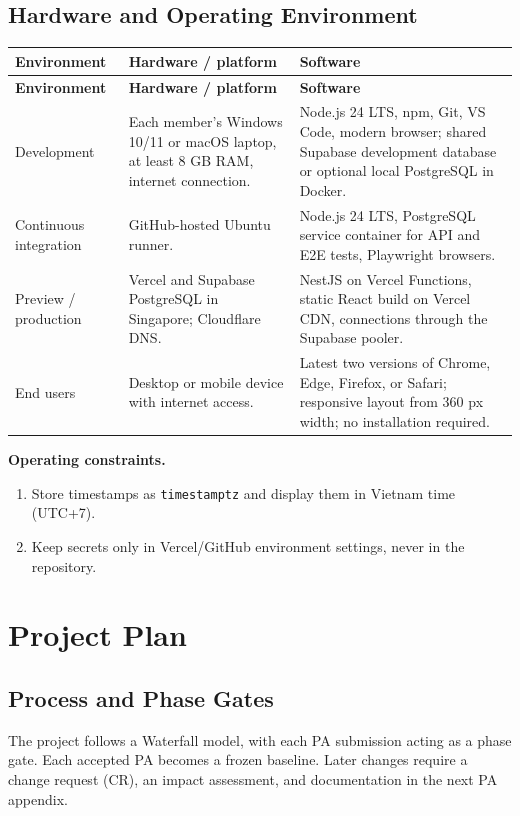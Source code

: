 \documentclass[11pt]{article}
\begin{document}
\subsection{Hardware and Operating Environment}
\begin{longtable}{@{}L{2.5cm}L{5.5cm}L{7.2cm}@{}}
\toprule
\textbf{Environment} & \textbf{Hardware / platform} & \textbf{Software} \\
\midrule
\endfirsthead
\toprule
\textbf{Environment} & \textbf{Hardware / platform} & \textbf{Software} \\
\midrule
\endhead
Development & Each member's Windows 10/11 or macOS laptop, at least 8 GB RAM, internet connection. & Node.js 24 LTS, npm, Git, VS Code, modern browser; shared Supabase development database or optional local PostgreSQL in Docker. \\
Continuous integration & GitHub-hosted Ubuntu runner. & Node.js 24 LTS, PostgreSQL service container for API and E2E tests, Playwright browsers. \\
Preview / production & Vercel and Supabase PostgreSQL in Singapore; Cloudflare DNS. & NestJS on Vercel Functions, static React build on Vercel CDN, connections through the Supabase pooler. \\
End users & Desktop or mobile device with internet access. & Latest two versions of Chrome, Edge, Firefox, or Safari; responsive layout from 360 px width; no installation required. \\
\bottomrule
\end{longtable}

\textbf{Operating constraints.}
\begin{enumerate}
  \item Store timestamps as \texttt{timestamptz} and display them in Vietnam time (UTC+7).
  \item Keep secrets only in Vercel/GitHub environment settings, never in the repository.
\end{enumerate}

\section{Project Plan}

\subsection{Process and Phase Gates}
The project follows a Waterfall model, with each PA submission acting as a phase gate. Each accepted PA becomes a frozen baseline. Later changes require a change request (CR), an impact assessment, and documentation in the next PA appendix.
\end{document}
